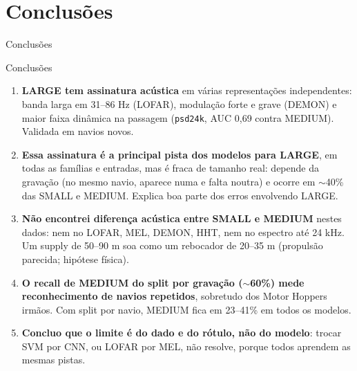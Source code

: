 \documentclass[aspectratio=169]{beamer}
\begin{document}
\section{Conclusões}

\begin{frame}
    \centering
    \huge Conclusões
\end{frame}

\begin{frame}{Conclusões}
    \footnotesize
    \begin{enumerate}
        \setlength{\itemsep}{3pt}
        \item \textbf{LARGE tem assinatura acústica} em várias representações independentes: banda larga em 31--86 Hz (LOFAR), modulação forte e grave (DEMON) e maior faixa dinâmica na passagem (\texttt{psd24k}, AUC 0,69 contra MEDIUM). Validada em navios novos.
        \item \textbf{Essa assinatura é a principal pista dos modelos para LARGE}, em todas as famílias e entradas, mas é fraca de tamanho real: depende da gravação (no mesmo navio, aparece numa e falta noutra) e ocorre em $\sim$40\% das SMALL e MEDIUM. Explica boa parte dos erros envolvendo LARGE.
        \item \textbf{Não encontrei diferença acústica entre SMALL e MEDIUM} nestes dados: nem no LOFAR, MEL, DEMON, HHT, nem no espectro até 24 kHz. Um supply de 50--90 m soa como um rebocador de 20--35 m (propulsão parecida; hipótese física).
        \item \textbf{O recall de MEDIUM do split por gravação ($\sim$60\%) mede reconhecimento de navios repetidos}, sobretudo dos Motor Hoppers irmãos. Com split por navio, MEDIUM fica em 23--41\% em todos os modelos.
        \item \textbf{Concluo que o limite é do dado e do rótulo, não do modelo}: trocar SVM por CNN, ou LOFAR por MEL, não resolve, porque todos aprendem as mesmas pistas.
    \end{enumerate}
\end{frame}
\end{document}
